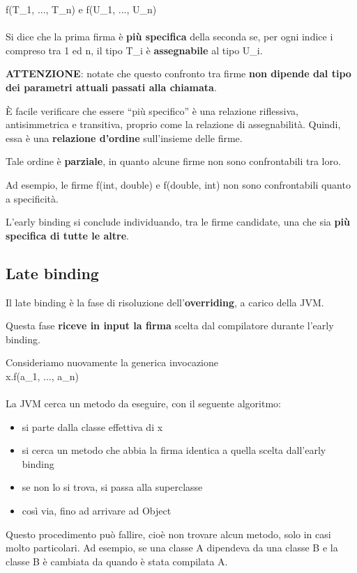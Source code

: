 \documentclass[10pt]{article}
\begin{document}
f(T\_1, ..., T\_n) e f(U\_1, ..., U\_n)\\\\
Si dice che la prima firma è \textbf{più specifica} della seconda se, per ogni indice i compreso tra 1 ed n, il tipo T\_i è \textbf{assegnabile} al tipo U\_i.

\textbf{ATTENZIONE}: notate che questo confronto tra firme \textbf{non dipende dal tipo dei parametri attuali passati alla chiamata}.

È facile verificare che essere “più specifico” è una relazione riflessiva, antisimmetrica e transitiva, proprio come la relazione di assegnabilità.
Quindi, essa è una \textbf{relazione d'ordine} sull'insieme delle firme.

Tale ordine è \textbf{parziale}, in quanto alcune firme non sono confrontabili tra loro.

Ad esempio, le firme f(int, double) e f(double, int) non sono confrontabili quanto a specificità.

L'early binding si conclude individuando, tra le firme candidate, una che sia \textbf{più specifica di tutte le altre}.
\subsection{Late binding}
Il late binding è la fase di risoluzione dell'\textbf{overriding}, a carico della JVM.

Questa fase \textbf{riceve in input la firma} scelta dal compilatore durante l'early binding.

Consideriamo nuovamente la generica invocazione\\

x.f(a\_1, ..., a\_n)\\\\
La JVM cerca un metodo da eseguire, con il seguente algoritmo:
\begin{itemize}
    \item si parte dalla classe effettiva di x
    \item si cerca un metodo che abbia la firma identica a quella scelta dall'early binding
    \item se non lo si trova, si passa alla superclasse
    \item così via, fino ad arrivare ad Object
\end{itemize}
Questo procedimento può fallire, cioè non trovare alcun metodo, solo in casi molto particolari.
Ad esempio, se una classe A dipendeva da una classe B e la classe B è cambiata da quando è stata 
compilata A.
\end{document}

